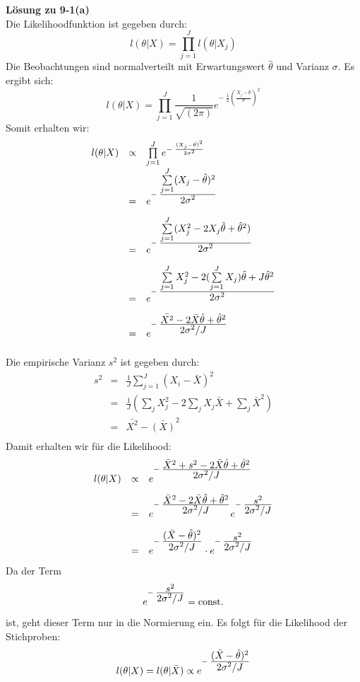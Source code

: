 \textbf{Lösung zu 9-1(a)} \\
Die Likelihoodfunktion ist gegeben durch: 
\[
l(\theta|X) = \prod_{j=1}^{J} l(\theta|X_j)
\]
Die Beobachtungen sind normalverteilt mit Erwartungswert 
$\hat{\theta}$ und Varianz $\sigma$. Es ergibt sich: 
\[
l(\theta|X) = \prod_{j=1}^{J} \frac{1}{\sqrt{(2 \pi)}} 
e^{-\;\frac{1}{2}\left(\frac{X_j-\hat{\theta}}{\sigma}\right)^2}
\]
Somit erhalten wir: 
\[
\begin{array}{rcl}
l(\theta|X) & \propto &  \prod\limits_{j=1}^{J} 
e^{-\;\frac{(X_j-\hat{\theta)}^2}{2\sigma^2}} \\[2ex]
&=& e^{-\;\frac{\textstyle\sum\limits_{j=1}^{J}(X_j-\hat{\theta})^2}
	{\textstyle 2 \sigma^2}} \\[2ex]
&=& e^{-\;\frac{\textstyle\sum\limits_{j=1}^{J}(X_j^2-2X_j\hat{\theta}
	+\hat{\theta}^2)}
	{\textstyle 2 \sigma^2}} \\[2ex]
&=& e^{-\;\frac{\textstyle\sum\limits_{j=1}^{J}X_j^2 
		- 2 (\sum\limits_{j=1}^{J}X_j) \hat{\theta}
		+J \hat{\theta}^2}
	{\textstyle 2 \sigma^2}} \\[2ex]
&=& e^{-\;\frac{\textstyle \bar{X^2}-2\bar{X}\hat{\theta}+\hat{\theta}^2}
	{\textstyle 2 \sigma^2/J}} \\[2ex]
\end{array}
\]
Die empirische Varianz $s^2$ ist gegeben durch:
\[
\begin{array}{rcl}
s^2 &=& \frac{1}{J} \sum\limits_{j=1}^{J} (X_i - \bar{X})^2 \\[2ex]
    &=& \frac{1}{J} (\sum_j X_j^2-2 \sum_j X_j \bar{X} + \sum_j \bar{X}^2) \\[2ex]
    &=& \bar{X^2} -\bar{(X)}^2 \\[2ex]
\end{array}
\] 
Damit erhalten wir für die Likelihood:
\[
\begin{array}{rcl}
l(\theta|X) & \propto & 
e^{-\;\frac{\textstyle \bar{X}^2 +s^2 -2\bar{X} \hat{\theta}+\hat{\theta}^2}
	{\textstyle 2 \sigma^2/J}} \\[2ex]
&=& e^{-\;\frac{\textstyle \bar{X}^2 -2\bar{X} \hat{\theta}+\hat{\theta}^2}
	{\textstyle 2 \sigma^2/J}}
e^{-\;\frac{\textstyle s^2 }
	{\textstyle 2 \sigma^2/J}} \\[2ex]
&=& e^{-\;\frac{\textstyle (\bar{X} - \hat{\theta})^2} 
	{\textstyle 2 \sigma^2/J}}
    \cdot e^{-\;\frac{\textstyle s^2 }
	{\textstyle 2 \sigma^2/J}} 
\end{array}
\]
Da der Term 
\[e^{-\;\frac{\textstyle s^2 }
	{\textstyle 2 \sigma^2/J}} = \mathrm{const.}
\]
ist, geht dieser Term nur in die Normierung ein. 
Es folgt für die Likelihood der Stichproben: 
\[
l(\theta|X) = l(\theta|\bar{X}) \propto e^{-\;\frac{\textstyle (\bar{X} - \hat{\theta})^2} 
	{\textstyle 2 \sigma^2/J}}
\]
